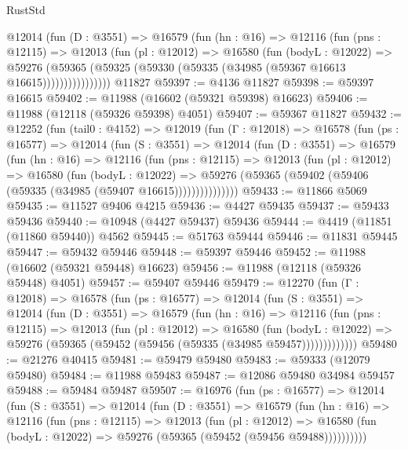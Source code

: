 \begin{lexlean}{RustStd}
\begin{coremodule}
            @12014
              (fun (D : @3551) =>
              @16579
                (fun (hn : @16) =>
                @12116
                  (fun (pns : @12115) =>
                  @12013
                    (fun (pl : @12012) =>
                    @16580
                      (fun (bodyL : @12022) =>
                      @59276
                        (@59365
                          (@59325 (@59330 (@59335 (@34985 (@59367 @16613 @16615))))))))))))))))
    @11827
@59397 := @4136 @11827
@59398 := @59397 @16615
@59402 := @11988 (@16602 (@59321 @59398) @16623)
@59406 := @11988 (@12118 (@59326 @59398) @4051)
@59407 := @59367 @11827
@59432 := @12252
    (fun (tail0 : @4152) =>
    @12019
      (fun (Γ : @12018) =>
      @16578
        (fun (ps : @16577) =>
        @12014
          (fun (S : @3551) =>
          @12014
            (fun (D : @3551) =>
            @16579
              (fun (hn : @16) =>
              @12116
                (fun (pns : @12115) =>
                @12013
                  (fun (pl : @12012) =>
                  @16580
                    (fun (bodyL : @12022) =>
                    @59276 (@59365 (@59402 (@59406 (@59335 (@34985 (@59407 @16615)))))))))))))))
@59433 := @11866 @5069
@59435 := @11527 @9406 @4215
@59436 := @4427 @59435
@59437 := @59433 @59436
@59440 := @10948 (@4427 @59437) @59436
@59444 := @4419 (@11851 (@11860 @59440)) @4562
@59445 := @51763 @59444
@59446 := @11831 @59445
@59447 := @59432 @59446
@59448 := @59397 @59446
@59452 := @11988 (@16602 (@59321 @59448) @16623)
@59456 := @11988 (@12118 (@59326 @59448) @4051)
@59457 := @59407 @59446
@59479 := @12270
    (fun (Γ : @12018) =>
    @16578
      (fun (ps : @16577) =>
      @12014
        (fun (S : @3551) =>
        @12014
          (fun (D : @3551) =>
          @16579
            (fun (hn : @16) =>
            @12116
              (fun (pns : @12115) =>
              @12013
                (fun (pl : @12012) =>
                @16580
                  (fun (bodyL : @12022) =>
                  @59276 (@59365 (@59452 (@59456 (@59335 (@34985 @59457)))))))))))))
@59480 := @21276 @40415
@59481 := @59479 @59480
@59483 := @59333 (@12079 @59480)
@59484 := @11988 @59483
@59487 := @12086 @59480 @34984 @59457
@59488 := @59484 @59487
@59507 := @16976
    (fun (ps : @16577) =>
    @12014
      (fun (S : @3551) =>
      @12014
        (fun (D : @3551) =>
        @16579
          (fun (hn : @16) =>
          @12116
            (fun (pns : @12115) =>
            @12013
              (fun (pl : @12012) =>
              @16580 (fun (bodyL : @12022) => @59276 (@59365 (@59452 (@59456 @59488))))))))))

\end{coremodule}
\end{lexlean}

